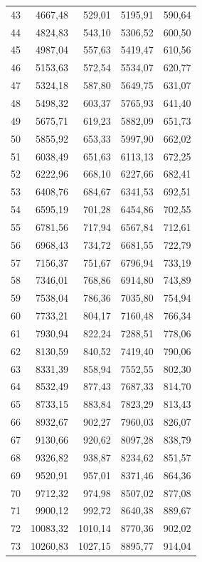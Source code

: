\begin{small}
\begin{longtable}{rrrrr}
43 & 4667,48 & 529,01 & 5195,91 & 590,64 \\
44 & 4824,83 & 543,10 & 5306,52 & 600,50 \\
45 & 4987,04 & 557,63 & 5419,47 & 610,56 \\
46 & 5153,63 & 572,54 & 5534,07 & 620,77 \\
47 & 5324,18 & 587,80 & 5649,75 & 631,07 \\
48 & 5498,32 & 603,37 & 5765,93 & 641,40 \\
49 & 5675,71 & 619,23 & 5882,09 & 651,73 \\
50 & 5855,92 & 653,33 & 5997,90 & 662,02 \\
51 & 6038,49 & 651,63 & 6113,13 & 672,25 \\
52 & 6222,96 & 668,10 & 6227,66 & 682,41 \\
53 & 6408,76 & 684,67 & 6341,53 & 692,51 \\
54 & 6595,19 & 701,28 & 6454,86 & 702,55 \\
55 & 6781,56 & 717,94 & 6567,84 & 712,61 \\
56 & 6968,43 & 734,72 & 6681,55 & 722,79 \\
57 & 7156,37 & 751,67 & 6796,94 & 733,19 \\
58 & 7346,01 & 768,86 & 6914,80 & 743,89 \\
59 & 7538,04 & 786,36 & 7035,80 & 754,94 \\
60 & 7733,21 & 804,17 & 7160,48 & 766,34 \\
61 & 7930,94 & 822,24 & 7288,51 & 778,06 \\
62 & 8130,59 & 840,52 & 7419,40 & 790,06 \\
63 & 8331,39 & 858,94 & 7552,55 & 802,30 \\
64 & 8532,49 & 877,43 & 7687,33 & 814,70 \\
65 & 8733,15 & 883,84 & 7823,29 & 813,43 \\
66 & 8932,67 & 902,27 & 7960,03 & 826,07 \\
67 & 9130,66 & 920,62 & 8097,28 & 838,79 \\
68 & 9326,82 & 938,87 & 8234,62 & 851,57 \\
69 & 9520,91 & 957,01 & 8371,46 & 864,36 \\
70 & 9712,32 & 974,98 & 8507,02 & 877,08 \\
71 & 9900,12 & 992,72 & 8640,38 & 889,67 \\
72 & 10083,32 & 1010,14 & 8770,36 & 902,02 \\
73 & 10260,83 & 1027,15 & 8895,77 & 914,04 \\

\end{longtable}
\end{small}
